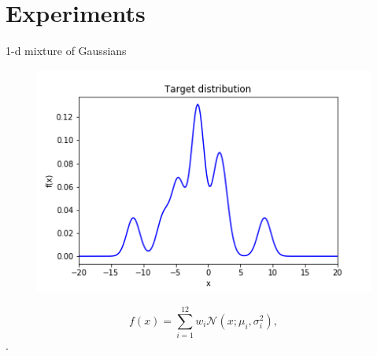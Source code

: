 \documentclass{beamer}
\begin{document}
\section{Experiments}
\begin{frame}
\begin{block}{1-d mixture of Gaussians}
	\begin{figure}
		\centering
		\includegraphics[width=0.6\linewidth]{figs/targetexil1a.png}
	\end{figure}
	\begin{displaymath}
	f(x) = \sum_{i=1}^{12} w_i \mathcal{N}(x;\mu_i,\sigma^2_i),
	\end{displaymath}
	.
\end{block}
\end{frame}
\end{document}
